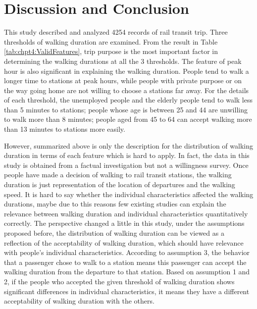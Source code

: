 %
\section{Discussion and Conclusion}
This study described and analyzed 4254 records of rail transit trip. Three thresholds of walking duration are examined. From the result in Table \ref{tab:chpt4:ValidFeatures}, trip purpose is the most important factor in determining the walking durations at all the 3 thresholds. The feature of peak hour is also significant in explaining the walking duration. People tend to walk a longer time to stations at peak hours, while people with private purpose or on the way going home are not willing to choose a stations far away. For the details of each threshold, the unemployed people and the elderly people tend to walk less than 5 minutes to stations; people whose age is between 25 and 44 are unwilling to walk more than 8 minutes; people aged from 45 to 64 can accept walking more than 13 minutes to stations more easily.

%
However, summarized above is only the description for the distribution of walking duration in terms of each feature which is hard to apply. In fact, the data in this study is obtained from a factual investigation but not a willingness survey. Once people have made a decision of walking to rail transit stations, the walking duration is just representation of the location of departures and the walking speed. It is hard to say whether the individual characteristics affected the walking durations, maybe due to this reasons few existing studies can explain the relevance between walking duration and individual characteristics quantitatively correctly. The perspective changed a little in this study, under the assumptions proposed before, the distribution of walking duration can be viewed as a reflection of the acceptability of walking duration, which should have relevance with people's individual characteristics. According to assumption 3, the behavior that a passenger chose to walk to a station means this passenger can accept the walking duration from the departure to that station. Based on assumption 1 and 2, if the people who accepted the given threshold of walking duration shows significant differences in individual characteristics, it means they have a different acceptability of walking duration with the others.

